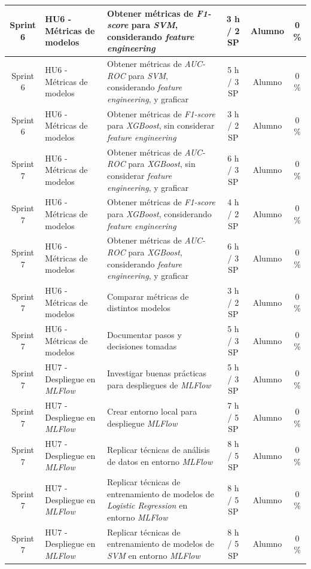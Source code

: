 \documentclass[
11pt, %
]{charter}
\begin{document}
\begin{xltabular}{\linewidth}{@{}|c|X|X|c|c|c|@{}}
Sprint 6 & HU6 - Métricas de modelos & Obtener métricas de \textit{F1-score} para \textit{SVM}, considerando \textit{feature engineering}  & 3 h / 2 SP & Alumno & 0 \%\\ \hline
Sprint 6 & HU6 - Métricas de modelos & Obtener métricas de \textit{AUC-ROC} para \textit{SVM}, considerando \textit{feature engineering}, y graficar  & 5 h / 3 SP & Alumno & 0 \%\\ \hline
Sprint 6 & HU6 - Métricas de modelos & Obtener métricas de \textit{F1-score} para \textit{XGBoost}, sin  considerar \textit{feature engineering}  & 3 h / 2 SP & Alumno & 0 \%\\ \hline

Sprint 7 & HU6 - Métricas de modelos & Obtener métricas de \textit{AUC-ROC} para \textit{XGBoost}, sin  considerar \textit{feature engineering}, y graficar  & 6 h / 3 SP & Alumno & 0 \%\\ \hline
Sprint 7 & HU6 - Métricas de modelos & Obtener métricas de \textit{F1-score} para \textit{XGBoost}, considerando \textit{feature engineering}  & 4 h / 2 SP & Alumno & 0 \%\\ \hline
Sprint 7 & HU6 - Métricas de modelos & Obtener métricas de \textit{AUC-ROC} para \textit{XGBoost}, considerando \textit{feature engineering}, y graficar  & 6 h / 3 SP & Alumno & 0 \%\\ \hline
Sprint 7 & HU6 - Métricas de modelos & Comparar métricas de distintos modelos  & 3 h / 2 SP & Alumno & 0 \%\\ \hline
Sprint 7 & HU6 - Métricas de modelos & Documentar pasos y decisiones tomadas & 5 h / 3 SP & Alumno & 0 \%\\ \hline
Sprint 7 & HU7 - Despliegue en \textit{MLFlow}  & Investigar buenas prácticas para despliegues de \textit{MLFlow}  & 5 h / 3 SP & Alumno & 0 \%\\ \hline
Sprint 7 & HU7 - Despliegue en \textit{MLFlow}  & Crear entorno local para despliegue \textit{MLFlow}  & 7 h / 5 SP & Alumno & 0 \%\\ \hline
Sprint 7 & HU7 - Despliegue en \textit{MLFlow}  & Replicar técnicas de análisis de datos en entorno \textit{MLFlow}  & 8 h / 5 SP & Alumno & 0 \%\\ \hline
Sprint 7 & HU7 - Despliegue en \textit{MLFlow}  & Replicar técnicas de entrenamiento de modelos de \textit{Logistic Regression} en entorno \textit{MLFlow}  & 8 h / 5 SP & Alumno & 0 \%\\ \hline
Sprint 7 & HU7 - Despliegue en \textit{MLFlow}  & Replicar técnicas de entrenamiento de modelos de \textit{SVM} en entorno \textit{MLFlow}  & 8 h / 5 SP & Alumno & 0 \%\\ \hline

\end{xltabular}
\end{document}
